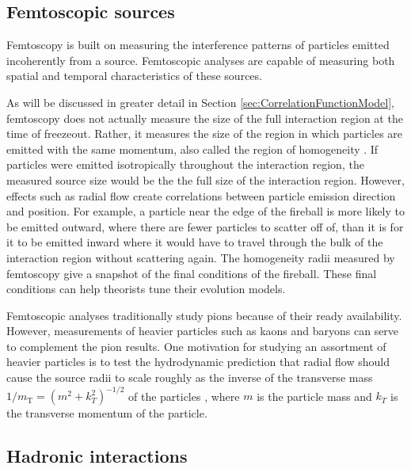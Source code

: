 \subsection{Femtoscopic sources}
\label{sec:FemtoSources}


Femtoscopy is built on measuring the interference patterns of particles emitted incoherently from a source.
Femtoscopic analyses are capable of measuring both spatial and temporal characteristics of these sources.


As will be discussed in greater detail in Section \ref{sec:CorrelationFunctionModel}, femtoscopy does not actually measure the size of the full interaction region at the time of freezeout.
Rather, it measures the size of the region in which particles are emitted with the same momentum, also called the region of homogeneity \cite{Akkelin:1995gh}.
If particles were emitted isotropically throughout the interaction region, the measured source size would be the the full size of the interaction region.
However, effects such as radial flow create correlations between particle emission direction and position. 
For example, a particle near the edge of the fireball is more likely to be emitted outward, where there are fewer particles to scatter off of, than it is for it to be emitted inward where it would have to travel through the bulk of the interaction region without scattering again. 
The homogeneity radii measured by femtoscopy give a snapshot of the final conditions of the fireball.
These final conditions can help theorists tune their evolution models.

Femtoscopic analyses traditionally study pions \cite{Goldhaber:1960sf,Aamodt:2011mr} because of their ready availability.  
However, measurements of heavier particles such as kaons \cite{Abelev:2012ms} and baryons \cite{Gos:2007cj} can serve to complement the pion results.  
One motivation for studying an assortment of heavier particles is to test the hydrodynamic prediction that radial flow should cause the source radii to scale roughly as the inverse of the transverse mass $1/m_{\mathrm{T}} = (m^2 + k^2_T)^{-1/2}$ of the particles \cite{Csorgo:1995bi,Lisa:2005dd}, where $m$ is the particle mass and $k_T$ is the transverse momentum of the particle.

\subsection{Hadronic interactions}
\label{sec:HadronicInteractions}




